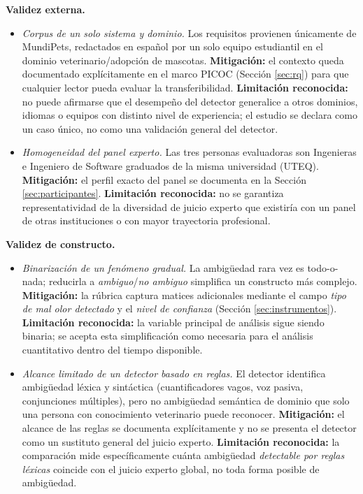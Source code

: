\documentclass[journal,onecolumn]{IEEEtran}
\begin{document}
	\textbf{Validez externa.}
	\begin{itemize}[leftmargin=*]
		\item \emph{Corpus de un solo sistema y dominio.} Los requisitos
		provienen únicamente de MundiPets, redactados en español por un solo
		equipo estudiantil en el dominio veterinario/adopción de mascotas.
		\textbf{Mitigación:} el contexto queda documentado explícitamente en
		el marco PICOC (Sección \ref{sec:rq}) para que cualquier lector pueda
		evaluar la transferibilidad. \textbf{Limitación reconocida:} no puede
		afirmarse que el desempeño del detector generalice a otros dominios,
		idiomas o equipos con distinto nivel de experiencia; el estudio se
		declara como un caso único, no como una validación general del
		detector.
		\item \emph{Homogeneidad del panel experto.} Las tres personas
		evaluadoras son Ingenieras e Ingeniero de Software graduados de la
		misma universidad (UTEQ). \textbf{Mitigación:} el perfil exacto del
		panel se documenta en la Sección \ref{sec:participantes}.
		\textbf{Limitación reconocida:} no se garantiza representatividad de
		la diversidad de juicio experto que existiría con un panel de otras
		instituciones o con mayor trayectoria profesional.
	\end{itemize}
	
	\textbf{Validez de constructo.}
	\begin{itemize}[leftmargin=*]
		\item \emph{Binarización de un fenómeno gradual.} La ambigüedad
		rara vez es todo-o-nada; reducirla a \emph{ambiguo}/\emph{no ambiguo}
		simplifica un constructo más complejo. \textbf{Mitigación:} la
		rúbrica captura matices adicionales mediante el campo \emph{tipo de
			mal olor detectado} y el \emph{nivel de confianza} (Sección
		\ref{sec:instrumentos}). \textbf{Limitación reconocida:} la variable
		principal de análisis sigue siendo binaria; se acepta esta
		simplificación como necesaria para el análisis cuantitativo dentro
		del tiempo disponible.
		\item \emph{Alcance limitado de un detector basado en reglas.} El
		detector identifica ambigüedad léxica y sintáctica (cuantificadores
		vagos, voz pasiva, conjunciones múltiples), pero no ambigüedad
		semántica de dominio que solo una persona con conocimiento
		veterinario puede reconocer. \textbf{Mitigación:} el alcance de las
		reglas se documenta explícitamente y no se presenta el detector como
		un sustituto general del juicio experto. \textbf{Limitación
			reconocida:} la comparación mide específicamente cuánta ambigüedad
		\emph{detectable por reglas léxicas} coincide con el juicio experto
		global, no toda forma posible de ambigüedad.
	\end{itemize}
	
\end{document}

